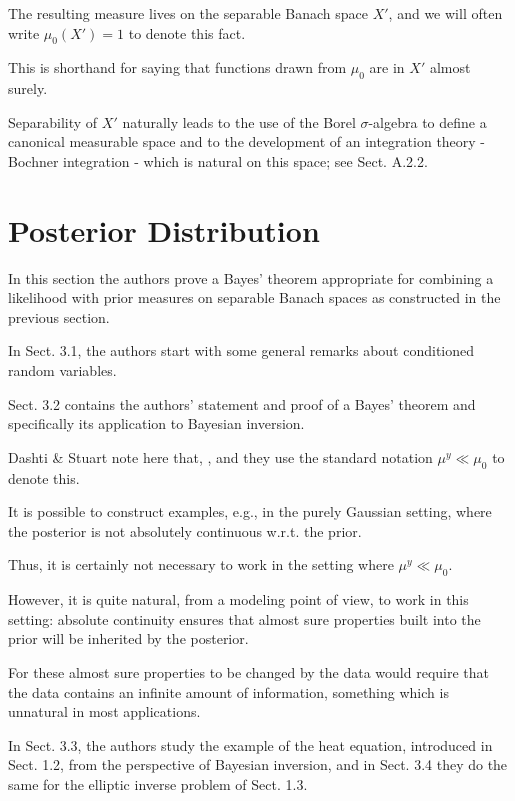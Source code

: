 \documentclass[oneside,11pt]{book}
\numberwithin{equation}{section}
\begin{document}
The resulting measure lives on the separable Banach space $X'$, and we will often write $\mu_0(X') = 1$ to denote this fact.

This is shorthand for saying that functions drawn from $\mu_0$ are in $X'$ almost surely.

Separability of $X'$ naturally leads to the use of the Borel $\sigma$-algebra to define a canonical measurable space and to the development of an integration theory - Bochner integration - which is natural on this space; see Sect. A.2.2.


\chapter{Posterior Distribution}
In this section the authors prove a Bayes' theorem appropriate for combining a likelihood with prior measures on separable Banach spaces as constructed in the previous section.

In Sect. 3.1, the authors start with some general remarks about conditioned random variables.

Sect. 3.2 contains the authors' statement and proof of a Bayes' theorem and specifically its application to Bayesian inversion.

Dashti \& Stuart note here that, , and they use the standard notation $\mu^y\ll\mu_0$ to denote this.

It is possible to construct examples, e.g., in the purely Gaussian setting, where the posterior is not absolutely continuous w.r.t. the prior.

Thus, it is certainly not necessary to work in the setting where $\mu^y\ll\mu_0$.

However, it is quite natural, from a modeling point of view, to work in this setting: absolute continuity ensures that almost sure properties built into the prior will be inherited by the posterior.

For these almost sure properties to be changed by the data would require that the data contains an infinite amount of information, something which is unnatural in most applications.

%
In Sect. 3.3, the authors study the example of the heat equation, introduced in Sect. 1.2, from the perspective of Bayesian inversion, and in Sect. 3.4 they do the same for the elliptic inverse problem of Sect. 1.3.
\end{document}
